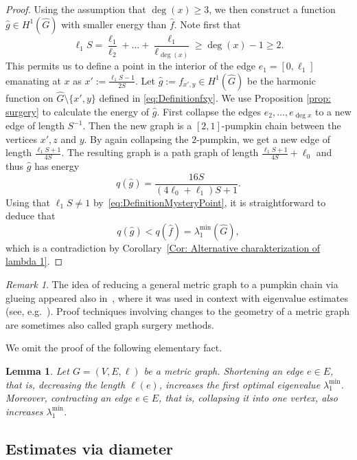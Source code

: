 \documentclass[reqno]{amsart}
\theoremstyle{plain}
\newtheorem{lem}[thm]{Lemma}
\theoremstyle{definition}
\theoremstyle{remark}
\newtheorem{rmk}[thm]{Remark}
\numberwithin{equation}{section}
\begin{document}
\begin{proof}
	Using the assumption that $\deg(x) \ge 3$, we then construct a function $\widehat g \in H^1(\widehat G)$ with smaller energy than $\widehat f$. Note first that
	\begin{equation} \label{eq:DefinitionMysteryPoint}
		\ell_1S = \frac{\ell_1}{\ell_2} + \dots + \frac{\ell_1}{\ell_{\deg(x)}} \geq \deg(x) -1 \geq 2. 
	\end{equation}
	This permits us to define a point in the interior of the edge $e_1=[0, \ell_1]$ emanating at $x$ as $x' := \frac{\ell_1S  -1}{2S}$. 
	Let $\widehat g := f_{x', y} \in H^1(\widehat G)$ be the harmonic function on $\widehat G \setminus \{x',y\}$ defined in \eqref{eq:Definitionfxy}. We use Proposition \ref{prop: surgery} to calculate the energy of $\widehat{g}$. First collapse the edges $e_2, \dots, e_{\deg x}$ to a new edge of length $S^{-1}$. Then the new graph is a $[2,1]$-pumpkin chain between the vertices $x', z$ and $y$. By again collapsing the $2$-pumpkin, we get a new edge of length $\frac{\ell_1S+1}{4S}$. The resulting graph is a path graph of length $\frac{\ell_1S+1}{4S}+\ell_0$ and thus $\widehat g$ has energy
	\[
	q(\widehat g) = \frac{16S}{(4\ell_0 + \ell_1)S +1}.
	\]
	Using that $\ell_1 S \neq 1$ by~\eqref{eq:DefinitionMysteryPoint}, it is straightforward to deduce that
	\[
	q(\widehat g) <  q(\widehat f) =  \lambda_{1}^{\min}(\widehat{G}),
	\]
	which is a contradiction by Corollary~\ref{Cor: Alternative charakterization of lambda 1}.
\end{proof}

\begin{rmk}
	The idea of reducing a general metric graph to a pumpkin chain via glueing appeared also in~\cite{surgery}, where it was used in context with eigenvalue estimates (see, e.g.~\cite[Proof of Lemma 5.1]{surgery}). Proof techniques involving changes to the geometry of a metric graph are sometimes also called graph surgery methods.
\end{rmk}
We omit the proof of the following elementary fact.

\begin{lem} \label{lem:DecreasingEdgeLength}
	Let $G =(V,E, \ell)$ be a metric graph. Shortening an edge $e \in E$, that is, decreasing the length $\ell(e)$, increases the first optimal eigenvalue $\lambda_1^{\min}$. Moreover, contracting an edge $e \in E$, that is, collapsing it into one vertex, also increases $\lambda_1^{\min}$.
\end{lem}


\subsection{Estimates via diameter}
\end{document}
